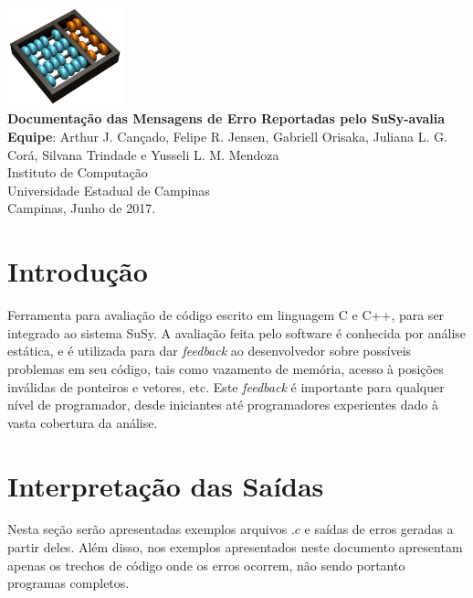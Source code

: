 \documentclass[12pt,a4paper]{report}
\begin{document}
\begin{titlepage}
    \begin{center}
        \vspace*{1cm}
        \includegraphics[width=0.25\textwidth]{Logo}\\
        \vspace{1.5cm}
        \Huge
    	\textbf{Documentação das Mensagens de Erro Reportadas pelo SuSy-avalia}\\
        \vspace{1.5cm}
        \Large
        \textbf{Equipe}: Arthur J. Cançado, Felipe R. Jensen, Gabriell Orisaka,   
 		Juliana L. G. Corá, Silvana Trindade e Yusseli L. M. Mendoza\\
        \vspace{1.2cm}
    	\Large 
    	Instituto de Computação\\
    	Universidade Estadual de Campinas\\
    	\vspace{1.5cm}
        Campinas, Junho de 2017.
    \end{center}
\end{titlepage}
\tableofcontents
\clearpage

\section{Introdução}
Ferramenta para avaliação de código escrito em linguagem C e C++, para ser integrado ao sistema SuSy.
A avaliação feita pelo software é conhecida por análise estática, e é utilizada para dar \textit{feedback} ao desenvolvedor sobre possíveis problemas em seu código, tais como vazamento de memória, acesso à posições inválidas de ponteiros e vetores, etc. 
Este \textit{feedback} é importante para qualquer nível de programador, desde iniciantes até programadores experientes dado à vasta cobertura da análise.

\section{Interpretação das Saídas}\label{interpretacao}
Nesta seção serão apresentadas exemplos arquivos $.c$ e saídas de erros geradas a partir deles.
Além disso, nos exemplos apresentados neste documento apresentam apenas os trechos de código onde os erros ocorrem, não sendo portanto programas completos.
\end{document}

